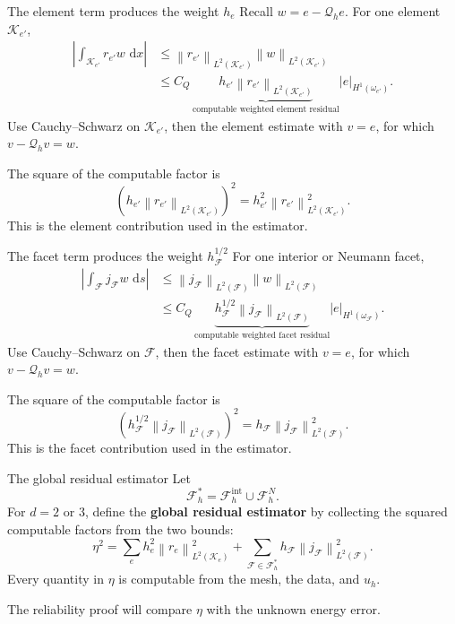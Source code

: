 \documentclass[11pt,aspectratio=169]{beamer}
\newcommand{\dd}{\,\mathrm{d}}
\newcommand{\Fh}{\mathcal F_h}
\newcommand{\Qh}{\mathcal Q_h}
\newcommand{\norm}[2][]{\left\lVert#2\right\rVert_{#1}}
\newcommand{\seminorm}[2][]{\left\lvert#2\right\rvert_{#1}}
\begin{document}
\begin{frame}{The element term produces the weight $h_e$}
Recall $w=e-\Qh e$. For one element $\mathcal K_{e'}$,
\[
\begin{aligned}
\left|\int_{\mathcal K_{e'}}r_{e'} w\,\dd x\right|
&\leq
\norm[L^2(\mathcal K_{e'})]{r_{e'}}
\norm[L^2(\mathcal K_{e'})]{w}\\[4pt]
&\leq
C_Q\,
\underbrace{h_{e'}\norm[L^2(\mathcal K_{e'})]{r_{e'}}}_{
\text{computable weighted element residual}}
\seminorm[H^1(\omega_{e'})]{e}.
\end{aligned}
\]
Use Cauchy--Schwarz on $\mathcal K_{e'}$, then the element estimate with
$v=e$, for which $v-\Qh v=w$.

The square of the computable factor is
\[
  \left(h_{e'}\norm[L^2(\mathcal K_{e'})]{r_{e'}}\right)^2
  =h_{e'}^2\norm[L^2(\mathcal K_{e'})]{r_{e'}}^2.
\]
This is the element contribution used in the estimator.
\end{frame}

\begin{frame}{The facet term produces the weight $h_{\mathcal F}^{1/2}$}
For one interior or Neumann facet,
\[
\begin{aligned}
\left|\int_{\mathcal F}j_{\mathcal F}w\,\dd s\right|
&\leq
\norm[L^2(\mathcal F)]{j_{\mathcal F}}
\norm[L^2(\mathcal F)]{w}\\
&\leq C_Q\,
\underbrace{h_{\mathcal F}^{1/2}
\norm[L^2(\mathcal F)]{j_{\mathcal F}}}_{
\text{computable weighted facet residual}}
\seminorm[H^1(\omega_{\mathcal F})]{e}.
\end{aligned}
\]
Use Cauchy--Schwarz on $\mathcal F$, then the facet estimate with $v=e$,
for which $v-\Qh v=w$.

The square of the computable factor is
\[
  \left(h_{\mathcal F}^{1/2}\norm[L^2(\mathcal F)]{j_{\mathcal F}}\right)^2
  =h_{\mathcal F}\norm[L^2(\mathcal F)]{j_{\mathcal F}}^2.
\]
This is the facet contribution used in the estimator.
\end{frame}

\begin{frame}{The global residual estimator}
Let
\[
  \Fh^\ast=\Fh^{\mathrm{int}}\cup\Fh^N.
\]
For $d=2$ or $3$, define the \textbf{global residual estimator} by collecting
the squared computable factors from the two bounds:
\[
\boxed{
  \eta^2=
  \sum_e h_e^2\norm[L^2(\mathcal K_e)]{r_e}^2
  +\sum_{\mathcal F\in\Fh^\ast}
   h_{\mathcal F}\norm[L^2(\mathcal F)]{j_{\mathcal F}}^2.}
\]
Every quantity in $\eta$ is computable from the mesh, the data, and $u_h$.

The reliability proof will compare $\eta$ with the unknown energy error.
\end{frame}
\end{document}
